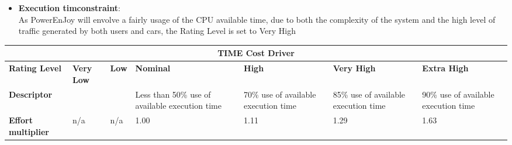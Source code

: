 \begin{itemize}
\item \textbf{Execution timconstraint}:\\
As PowerEnJoy will envolve a fairly usage of the CPU available time, due to both the complexity of the system and the high level of traffic generated by both users and cars, the Rating Level is set to Very High
\end{itemize}
\hspace*{-3cm}\begin{tabular}{|p{3cm}|p{2cm}|p{2cm}|p{2cm}|p{2cm}|p{2cm}|p{2cm}|}
\hline
\multicolumn{7}{|c|}{\textbf{TIME Cost Driver}}\\
\hline
\hline
\textbf{Rating Level} & \textbf{Very Low} & \textbf{Low} & \textbf{Nominal} & \textbf{High} & \textbf{Very High} & \textbf{Extra High}\\
\hline
\textbf{Descriptor} &  &  & Less than 50\% use of available execution time & 70\% use of available execution time & 85\% use of available execution time & 90\% use of available execution time\\
\hline
\textbf{Effort multiplier} & n/a & n/a & 1.00 & 1.11 & 1.29 & 1.63\\
\hline 
\end{tabular}